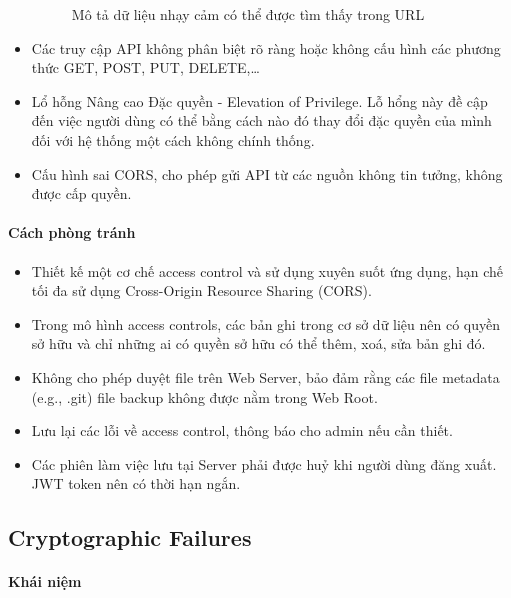\begin{itemize}
\begin{figure}[H]
        \caption{Mô tả dữ liệu nhạy cảm có thể được tìm thấy trong URL ~\cite{chap2bib3}}
        \label{fib:DuLieuNhayCam}
    \end{figure}
    \item Các truy cập API không phân biệt rõ ràng hoặc không cấu hình các phương thức GET, POST, PUT, DELETE,…
    \item Lổ hỗng Nâng cao Đặc quyền - Elevation of Privilege. Lỗ hổng này đề cập đến việc người dùng có thể bằng cách nào đó thay đổi đặc quyền của mình đối với hệ thống một cách không chính thống.
    \item Cấu hình sai CORS, cho phép gửi API từ các nguồn không tin tưởng, không được cấp quyền.
\end{itemize}

\paragraph{Cách phòng tránh}

\begin{itemize}
    \item Thiết kế một cơ chế access control và sử dụng xuyên suốt ứng dụng, hạn chế tối đa sử dụng Cross-Origin Resource Sharing (CORS).
    \item Trong mô hình access controls, các bản ghi trong cơ sở dữ liệu nên có quyền sở hữu và chỉ những ai có quyền sở hữu có thể thêm, xoá, sửa bản ghi đó.
    \item Không cho phép duyệt file trên Web Server, bảo đảm rằng các file metadata (e.g., .git) file backup không được nằm trong Web Root.
    \item Lưu lại các lỗi về access control, thông báo cho admin nếu cần thiết.
    \item Các phiên làm việc lưu tại Server phải được huỷ khi người dùng đăng xuất. JWT token nên có thời hạn ngắn.
\end{itemize}

\subsection{Cryptographic Failures ~\cite{chap2bib7}}

\paragraph{Khái niệm ~\cite{chap2bib8}}

